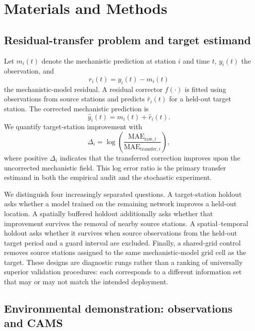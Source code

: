 \section{Materials and Methods}

\subsection{Residual-transfer problem and target estimand}

Let $m_i(t)$ denote the mechanistic prediction at station $i$ and time $t$, $y_i(t)$ the observation, and
\begin{equation}
 r_i(t)=y_i(t)-m_i(t)
\end{equation}
the mechanistic-model residual. A residual corrector $f(\cdot)$ is fitted using observations from source stations and predicts $\widehat r_i(t)$ for a held-out target station. The corrected mechanistic prediction is
\begin{equation}
 \widehat y_i(t)=m_i(t)+\widehat r_i(t).
\end{equation}
We quantify target-station improvement with
\begin{equation}
 \Delta_i=\log\left(\frac{\mathrm{MAE}_{\mathrm{raw},i}}{\mathrm{MAE}_{\mathrm{transfer},i}}\right),
\end{equation}
where positive $\Delta_i$ indicates that the transferred correction improves upon the uncorrected mechanistic field. This log error ratio is the primary transfer estimand in both the empirical audit and the stochastic experiment.

We distinguish four increasingly separated questions. A target-station holdout asks whether a model trained on the remaining network improves a held-out location. A spatially buffered holdout additionally asks whether that improvement survives the removal of nearby source stations. A spatial--temporal holdout asks whether it survives when source observations from the held-out target period and a guard interval are excluded. Finally, a shared-grid control removes source stations assigned to the same mechanistic-model grid cell as the target. These designs are diagnostic rungs rather than a ranking of universally superior validation procedures: each corresponds to a different information set that may or may not match the intended deployment.

\subsection{Environmental demonstration: observations and CAMS}

